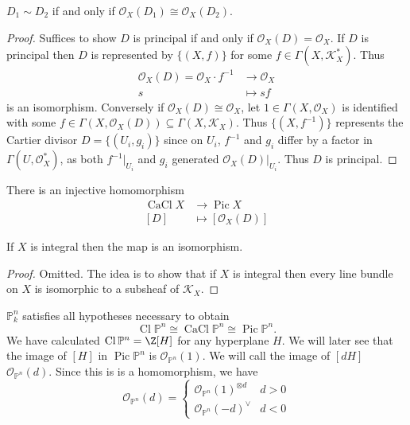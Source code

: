 \documentclass[a4paper]{article}
\renewcommand*{\P}{\mathbb{P}}
\newcommand{\sh}[1]{\mathcal{#1}} %
\DeclareMathOperator{\Pic}{Pic} %
\DeclareMathOperator{\Cl}{Cl} %
\DeclareMathOperator{\CaCl}{CaCl} %
\begin{document}
\begin{lemma}
  \(D_1 \sim D_2\) if and only if \(\sh O_X(D_1) \cong \sh O_X(D_2)\).
\end{lemma}

\begin{proof}
  Suffices to show \(D\) is principal if and only if \(\sh O_X(D) = \sh O_X\). If \(D\) is principal then \(D\) is represented by \(\{(X, f)\}\) for some \(f \in \Gamma(X, \sh K_X^*)\). Thus
  \begin{align*}
    \sh O_X(D) = \sh O_X \cdot f^{-1} &\to \sh O_X \\
    s &\mapsto sf
  \end{align*}
  is an isomorphism. Conversely if \(\sh O_X(D) \cong \sh O_X\), let \(1 \in \Gamma(X, \sh O_X)\) is identified with some \(f \in \Gamma(X, \sh O_X(D)) \subseteq \Gamma(X, \sh K_X)\). Thus \(\{(X, f^{-1})\}\) represents the Cartier divisor \(D = \{(U_i, g_i)\}\) since on \(U_i\), \(f^{-1}\) and \(g_i\) differ by a factor in \(\Gamma(U, \sh O_X^*)\), as both \(f^{-1}|_{U_i}\) and \(g_i\) generated \(\sh O_X(D)|_{U_i}\). Thus \(D\) is principal.
\end{proof}

\begin{corollary}
  There is an injective homomorphism
  \begin{align*}
    \CaCl X &\to \Pic X \\
    [D] &\mapsto [\sh O_X(D)]
  \end{align*}
\end{corollary}

\begin{proposition}
  If \(X\) is integral then the map is an isomorphism.
\end{proposition}

\begin{proof}
  Omitted. The idea is to show that if \(X\) is integral then every line bundle on \(X\) is isomorphic to a subsheaf of \(\sh K_X\).
\end{proof}

\begin{eg}
  \(\P_k^n\) satisfies all hypotheses necessary to obtain
  \[
    \Cl \P^n \cong \CaCl \P^n \cong \Pic \P^n.
  \]
  We have calculated \(\Cl \P^n = \Z[H]\) for any hyperplane \(H\). We will later see that the image of \([H]\) in \(\Pic \P^n\) is \(\sh O_{\P^n}(1)\). We will call the image of \([d H]\) \(\sh O_{\P^n}(d)\). Since this is is a homomorphism, we have
  \[
    \sh O_{\P^n}(d) =
    \begin{cases}
      \sh O_{\P^n}(1)^{\otimes d} & d > 0 \\
      \sh O_{\P^n}(-d)^\vee & d < 0
    \end{cases}
  \]
\end{eg}
\end{document}
